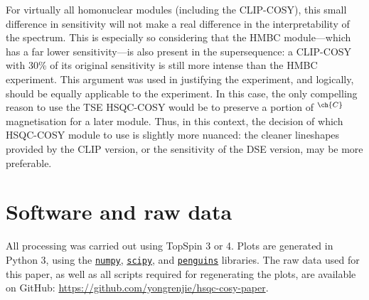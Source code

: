 \documentclass[a4paper,12pt]{article}
\newcommand{\carbon}{\ch{^{13}C}}
\newcommand{\magn}[1]{\ch{^1H}$^{\ch{#1}}$}
\begin{document}
\begin{refsection}
For virtually all homonuclear modules (including the CLIP-COSY), this small difference in sensitivity will not make a real difference in the interpretability of the spectrum.
This is especially so considering that the HMBC module---which has a far lower sensitivity---is also present in the supersequence:
a CLIP-COSY with 30\% of its original sensitivity is still more intense than the HMBC experiment.
This argument was used in justifying the  experiment, and logically, should be equally applicable to the  experiment.
In this case, the only compelling reason to use the TSE HSQC-COSY would be to preserve a portion of \magn{C} magnetisation for a later \carbon{} module.
Thus, in this context, the decision of which HSQC-COSY module to use is slightly more nuanced: the cleaner lineshapes provided by the CLIP version, or the sensitivity of the DSE version, may be more preferable.


\section{Software and raw data}

All processing was carried out using TopSpin 3 or 4.
Plots are generated in Python 3, using the \href{https://github.com/numpy/numpy}{\texttt{numpy}}, \href{https://github.com/scipy/scipy}{\texttt{scipy}}, and \href{https://github.com/yongrenjie/penguins}{\texttt{penguins}} libraries.
The raw data used for this paper, as well as all scripts required for regenerating the plots, are available on GitHub: \url{https://github.com/yongrenjie/hsqc-cosy-paper}.


\clearpage    %

\end{refsection}
\end{document}

